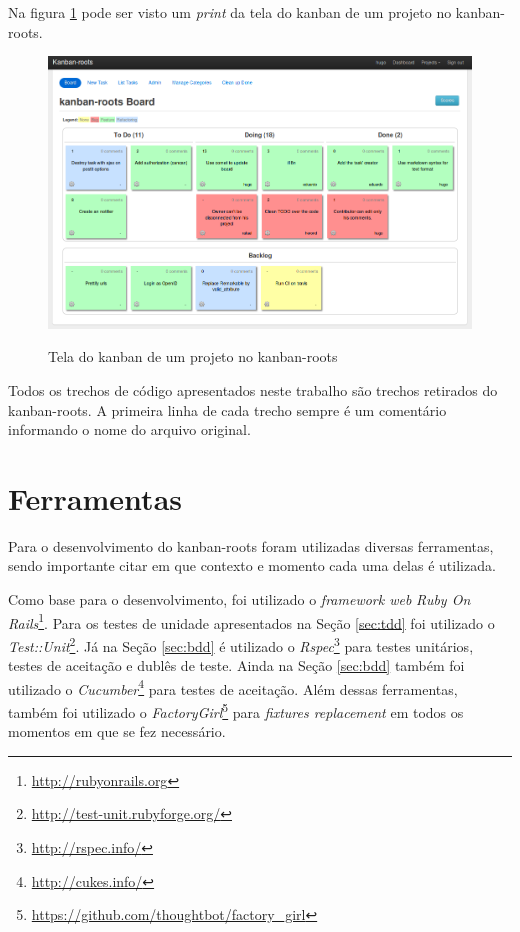 Na figura \ref{img:tela_kaban_roots} pode ser visto um \textit{print} da tela do kanban de um projeto no kanban-roots.

\begin{figure}[h]
  \center
  \caption{Tela do kanban de um projeto no kanban-roots}
  \includegraphics[scale=0.45]{images/kanban-roots}
  \label{img:tela_kaban_roots}
\end{figure}

Todos os trechos de código apresentados neste trabalho são trechos retirados do kanban-roots. A primeira linha de cada trecho sempre é um comentário informando o nome do arquivo original.

\section{Ferramentas}

Para o desenvolvimento do kanban-roots foram utilizadas diversas ferramentas, sendo importante citar em que contexto e momento cada uma delas é utilizada.

Como base para o desenvolvimento, foi utilizado o \textit{framework web} \textit{Ruby On Rails}\footnote{\url{http://rubyonrails.org}}. Para os testes de unidade apresentados na Seção \ref{sec:tdd} foi utilizado o \textit{Test::Unit}\footnote{\url{http://test-unit.rubyforge.org/}}. Já na Seção \ref{sec:bdd} é utilizado o \textit{Rspec}\footnote{\url{http://rspec.info/}} para testes unitários, testes de aceitação e dublês de teste. Ainda na Seção \ref{sec:bdd} também foi utilizado o \textit{Cucumber}\footnote{\url{http://cukes.info/}} para testes de aceitação. Além dessas ferramentas, também foi utilizado o \textit{FactoryGirl}\footnote{\url{https://github.com/thoughtbot/factory_girl}} para \textit{fixtures replacement} em todos os momentos em que se fez necessário.